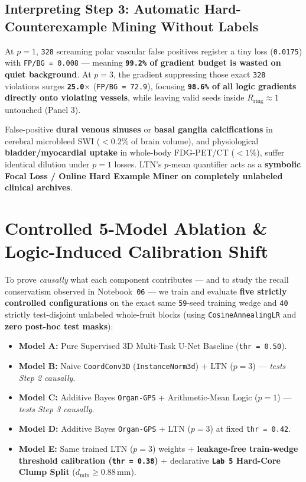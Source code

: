 \documentclass[10pt,a4paper]{article}
\begin{document}
\subsection*{Interpreting Step 3: Automatic Hard-Counterexample Mining Without Labels}
At \textbf{$p = 1$}, \texttt{328} screaming polar vascular false positives register a tiny loss (\texttt{0.0175}) with \texttt{FP/BG = 0.008} --- meaning \textbf{\texttt{99.2\%} of gradient budget is wasted on quiet background}. At \textbf{$p = 3$}, the gradient suppressing those exact \texttt{328} violations surges \textbf{\texttt{25.0$\times$}} (\texttt{FP/BG = 72.9}), focusing \textbf{\texttt{98.6\%} of all logic gradients directly onto violating vessels}, while leaving valid seeds inside $R_{\text{ring}} \approx 1$ untouched (Panel 3).

\begin{clinbox}
False-positive \textbf{dural venous sinuses} or \textbf{basal ganglia calcifications} in cerebral microbleed SWI ($<0.2\%$ of brain volume), and physiological \textbf{bladder/myocardial uptake} in whole-body FDG-PET/CT ($<1\%$), suffer identical dilution under $p=1$ losses. LTN's $p$-mean quantifier acts as a \textbf{symbolic Focal Loss / Online Hard Example Miner on completely unlabeled clinical archives}.
\end{clinbox}

\section{Controlled 5-Model Ablation \& Logic-Induced Calibration Shift}

To prove \textit{causally} what each component contributes --- and to study the recall conservatism observed in Notebook~\texttt{06} --- we train and evaluate \textbf{five strictly controlled configurations} on the exact same \texttt{59}-seed training wedge and \texttt{40} strictly test-disjoint unlabeled whole-fruit blocks (using \texttt{CosineAnnealingLR} and \textbf{zero post-hoc test masks}):
\begin{itemize}
    \item \textbf{Model A:} Pure Supervised 3D Multi-Task U-Net Baseline (\texttt{thr = 0.50}).
    \item \textbf{Model B:} Naive \texttt{CoordConv3D} (\texttt{InstanceNorm3d}) + LTN ($p=3$) --- \textit{tests Step 2 causally}.
    \item \textbf{Model C:} Additive Bayes \texttt{Organ-GPS} + Arithmetic-Mean Logic ($p=1$) --- \textit{tests Step 3 causally}.
    \item \textbf{Model D:} Additive Bayes \texttt{Organ-GPS} + LTN ($p=3$) at fixed \texttt{thr = 0.42}.
    \item \textbf{Model E:} Same trained LTN ($p=3$) weights + \textbf{leakage-free train-wedge threshold calibration (\texttt{thr = 0.38})} + declarative \textbf{\texttt{Lab 5} Hard-Core Clump Split} ($d_{\min} \ge 0.88\,\text{mm}$).
\end{itemize}
\end{document}
